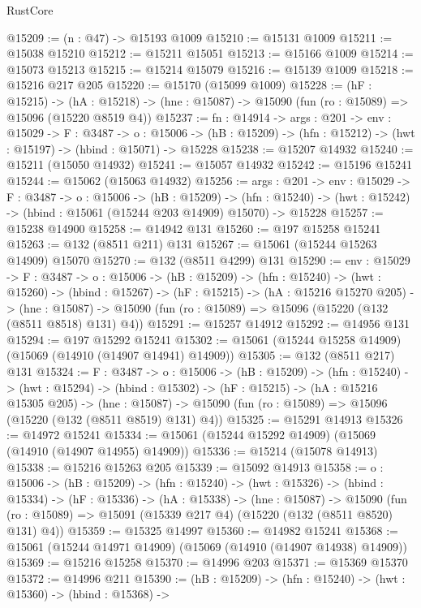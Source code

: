 \begin{lexlean}{RustCore}
\begin{coremodule}
@15209 := (n : @47) -> @15193 @1009
@15210 := @15131 @1009
@15211 := @15038 @15210
@15212 := @15211 @15051
@15213 := @15166 @1009
@15214 := @15073 @15213
@15215 := @15214 @15079
@15216 := @15139 @1009
@15218 := @15216 @217 @205
@15220 := @15170 (@15099 @1009)
@15228 := (hF : @15215) ->
  (hA : @15218) -> (hne : @15087) -> @15090 (fun (ro : @15089) => @15096 (@15220 @8519 @4))
@15237 := {fn : @14914} ->
  {args : @201} ->
  {env : @15029} ->
  {F : @3487} ->
  {o : @15006} -> (hB : @15209) -> (hfn : @15212) -> (hwt : @15197) -> (hbind : @15071) -> @15228
@15238 := @15207 @14932
@15240 := @15211 (@15050 @14932)
@15241 := @15057 @14932
@15242 := @15196 @15241
@15244 := @15062 (@15063 @14932)
@15256 := {args : @201} ->
  {env : @15029} ->
  {F : @3487} ->
  {o : @15006} ->
  (hB : @15209) ->
  (hfn : @15240) -> (hwt : @15242) -> (hbind : @15061 (@15244 @203 @14909) @15070) -> @15228
@15257 := @15238 @14900
@15258 := @14942 @131
@15260 := @197 @15258 @15241
@15263 := @132 (@8511 @211) @131
@15267 := @15061 (@15244 @15263 @14909) @15070
@15270 := @132 (@8511 @4299) @131
@15290 := {env : @15029} ->
  {F : @3487} ->
  {o : @15006} ->
  (hB : @15209) ->
  (hfn : @15240) ->
  (hwt : @15260) ->
  (hbind : @15267) ->
  (hF : @15215) ->
  (hA : @15216 @15270 @205) ->
  (hne : @15087) -> @15090 (fun (ro : @15089) => @15096 (@15220 (@132 (@8511 @8518) @131) @4))
@15291 := @15257 @14912
@15292 := @14956 @131
@15294 := @197 @15292 @15241
@15302 := @15061 (@15244 @15258 @14909) (@15069 (@14910 (@14907 @14941) @14909))
@15305 := @132 (@8511 @217) @131
@15324 := {F : @3487} ->
  {o : @15006} ->
  (hB : @15209) ->
  (hfn : @15240) ->
  (hwt : @15294) ->
  (hbind : @15302) ->
  (hF : @15215) ->
  (hA : @15216 @15305 @205) ->
  (hne : @15087) -> @15090 (fun (ro : @15089) => @15096 (@15220 (@132 (@8511 @8519) @131) @4))
@15325 := @15291 @14913
@15326 := @14972 @15241
@15334 := @15061 (@15244 @15292 @14909) (@15069 (@14910 (@14907 @14955) @14909))
@15336 := @15214 (@15078 @14913)
@15338 := @15216 @15263 @205
@15339 := @15092 @14913
@15358 := {o : @15006} ->
  (hB : @15209) ->
  (hfn : @15240) ->
  (hwt : @15326) ->
  (hbind : @15334) ->
  (hF : @15336) ->
  (hA : @15338) ->
  (hne : @15087) ->
  @15090 (fun (ro : @15089) => @15091 (@15339 @217 @4) (@15220 (@132 (@8511 @8520) @131) @4))
@15359 := @15325 @14997
@15360 := @14982 @15241
@15368 := @15061 (@15244 @14971 @14909) (@15069 (@14910 (@14907 @14938) @14909))
@15369 := @15216 @15258
@15370 := @14996 @203
@15371 := @15369 @15370
@15372 := @14996 @211
@15390 := (hB : @15209) ->
  (hfn : @15240) ->
  (hwt : @15360) ->
  (hbind : @15368) ->

\end{coremodule}
\end{lexlean}
